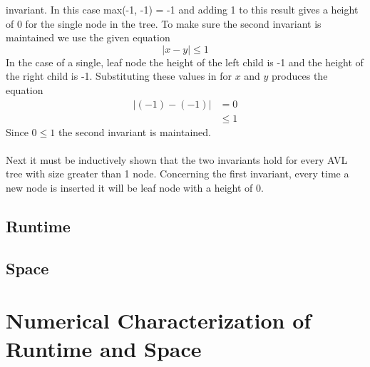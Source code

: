 \documentclass[12pt]{article}
\begin{document}
invariant.  In this case max(-1, -1) = -1 and adding 1 to this result gives a
height of 0 for the single node in the tree.  To make sure the second invariant
is maintained we use the given equation
$$
|x-y| \le 1
$$
In the case of a single, leaf node the height of the left child is
-1 and the height of the right child is -1.  Substituting these values in for
$x$ and $y$ produces the equation
\begin{align*}
|(-1)-(-1)| &= 0\\
&\le 1
\end{align*}
Since $0 \le 1$ the second invariant is maintained.\\
\\
Next it must be inductively shown that the two invariants hold for every AVL
tree with size greater than 1 node.  Concerning the first invariant, every time
a new node is inserted it will be leaf node with a height of 0.  

\subsection*{Runtime}

\subsection*{Space}

\section*{Numerical Characterization of Runtime and Space}

\end{document}
